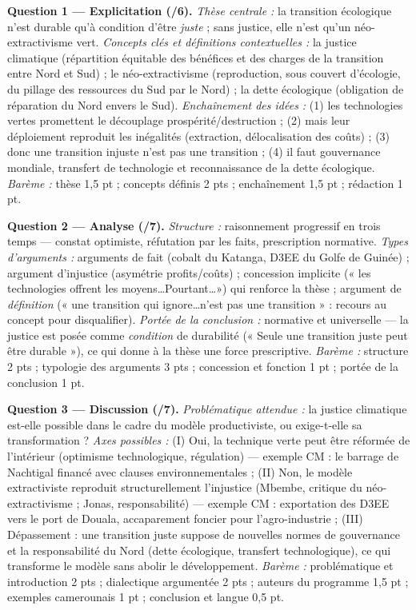 \documentclass[11pt]{article}
\newcommand{\cle}[1]{{\popxbold\color{popdark}#1}}
\begin{document}
\begin{corrige}
\textbf{Question 1 — Explicitation (/6).} \emph{Thèse centrale :} la transition écologique n'est durable qu'à condition d'être \emph{juste} ; sans justice, elle n'est qu'un \cle{néo-extractivisme} vert. \emph{Concepts clés et définitions contextuelles :} la \cle{justice climatique} (répartition équitable des bénéfices et des charges de la transition entre Nord et Sud) ; le \cle{néo-extractivisme} (reproduction, sous couvert d'écologie, du pillage des ressources du Sud par le Nord) ; la \cle{dette écologique} (obligation de réparation du Nord envers le Sud). \emph{Enchaînement des idées :} (1) les technologies vertes promettent le découplage prospérité/destruction ; (2) mais leur déploiement reproduit les inégalités (extraction, délocalisation des coûts) ; (3) donc une transition injuste n'est pas une transition ; (4) il faut gouvernance mondiale, transfert de technologie et reconnaissance de la dette écologique. \emph{Barème :} thèse 1,5 pt ; concepts définis 2 pts ; enchaînement 1,5 pt ; rédaction 1 pt.

\textbf{Question 2 — Analyse (/7).} \emph{Structure :} raisonnement progressif en trois temps — constat optimiste, réfutation par les faits, prescription normative. \emph{Types d'arguments :} arguments de fait (cobalt du Katanga, D3EE du Golfe de Guinée) ; argument d'\cle{injustice} (asymétrie profits/coûts) ; \cle{concession} implicite (« les technologies offrent les moyens\dots Pourtant\dots ») qui renforce la thèse ; argument de \emph{définition} (« une transition qui ignore\dots n'est pas une transition » : recours au concept pour disqualifier). \emph{Portée de la conclusion :} normative et universelle — la justice est posée comme \emph{condition} de durabilité (« Seule une transition juste peut être durable »), ce qui donne à la thèse une force prescriptive. \emph{Barème :} structure 2 pts ; typologie des arguments 3 pts ; concession et fonction 1 pt ; portée de la conclusion 1 pt.

\textbf{Question 3 — Discussion (/7).} \emph{Problématique attendue :} la justice climatique est-elle possible dans le cadre du modèle productiviste, ou exige-t-elle sa transformation ? \emph{Axes possibles :} (I) Oui, la technique verte peut être réformée de l'intérieur (optimisme technologique, régulation) — exemple CM : le barrage de Nachtigal financé avec clauses environnementales ; (II) Non, le modèle extractiviste reproduit structurellement l'injustice (Mbembe, critique du néo-extractivisme ; Jonas, responsabilité) — exemple CM : exportation des D3EE vers le port de Douala, accaparement foncier pour l'agro-industrie ; (III) Dépassement : une transition juste suppose de nouvelles normes de gouvernance et la responsabilité du Nord (dette écologique, transfert technologique), ce qui transforme le modèle sans abolir le développement. \emph{Barème :} problématique et introduction 2 pts ; dialectique argumentée 2 pts ; auteurs du programme 1,5 pt ; exemples camerounais 1 pt ; conclusion et langue 0,5 pt.
\end{corrige}
\end{document}
